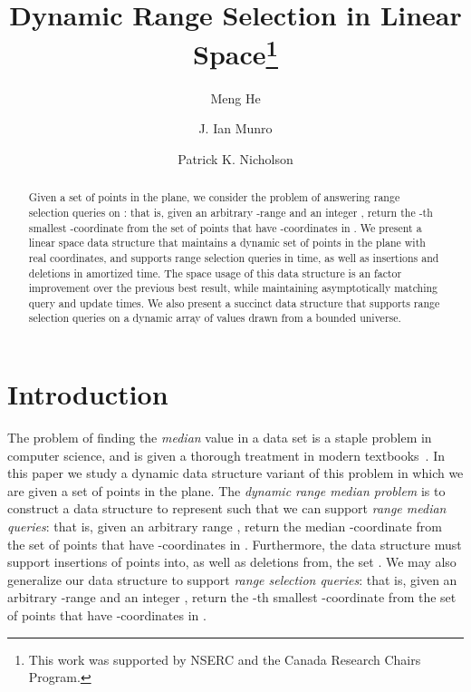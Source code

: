 \documentclass{llncs}
\begin{document}
\title{Dynamic Range Selection in Linear Space\thanks{This work was
    supported by NSERC and the Canada Research Chairs Program.}}

\author{Meng He \and J. Ian Munro \and Patrick K. Nicholson}


\maketitle
\begin{abstract}
  Given a set  of  points in the plane, we consider the problem
  of answering range selection queries on : that is, given an
  arbitrary -range  and an integer , return the -th
  smallest -coordinate from the set of points that have
  -coordinates in . We present a linear space data structure
  that maintains a dynamic set of  points in the plane with real
  coordinates, and supports range selection queries in  time, as well as insertions and deletions in  amortized time.  The space usage of this data
  structure is an  factor improvement over
  the previous best result, while maintaining asymptotically matching
  query and update times.  We also present a succinct data structure
  that supports range selection queries on a dynamic array of 
  values drawn from a bounded universe.
\end{abstract}


\section{Introduction}

The problem of finding the \emph{median} value in a data set is a
staple problem in computer science, and is given a thorough treatment
in modern textbooks~\cite{CSRL01}.  In this paper we study a dynamic
data structure variant of this problem in which we are given a set 
of  points in the plane.  The \emph{dynamic range median problem}
is to construct a data structure to represent  such that we can
support \emph{range median queries}: that is, given an arbitrary range , return the median -coordinate from the set of points
that have -coordinates in .  Furthermore, the data structure
must support insertions of points into, as well as deletions from, the
set .  We may also generalize our data structure to support
\emph{range selection queries}: that is, given an arbitrary -range  and an integer , return the -th smallest
-coordinate from the set of points that have -coordinates in
.
\end{document}
